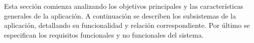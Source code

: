 Esta sección comienza analizando los objetivos principales y las características generales de la aplicación. A continuación se describen los subsistemas de la aplicación, detallando su funcionalidad y relación correspondiente. Por último se especifican los requisitos funcionales y no funcionales del sistema.